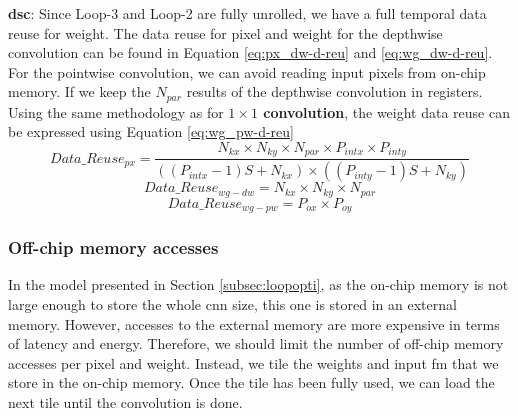 \textbf{\acrshort{dsc}}: Since Loop-3 and Loop-2 are fully unrolled, we have a full temporal data reuse for weight. The data reuse for pixel and weight for the depthwise convolution can be found in Equation \eqref{eq:px_dw-d-reu} \cite{ma_optimizing_2018} and \eqref{eq:wg_dw-d-reu}. For the pointwise convolution, we can avoid reading input pixels from on-chip memory. If we keep the $N_{par}$ results of the depthwise convolution in registers.
Using the same methodology as for \textbf{$1 \times 1$ convolution}, the weight data reuse can be expressed using Equation \eqref{eq:wg_pw-d-reu}
%
\begin{equation}
    Data\_Reuse_{px} = \frac{N_{kx} \times N_{ky} \times N_{par} \times P_{intx} \times P_{inty}}{\left( \left( P_{intx} - 1 \right)S + N_{kx} \right) \times \left( \left( P_{inty} - 1 \right)S + N_{ky} \right)}
    \label{eq:px_dw-d-reu}
\end{equation}
\begin{equation}
    Data\_Reuse_{wg-dw} = N_{kx} \times N_{ky} \times N_{par}
    \label{eq:wg_dw-d-reu}
\end{equation}
\begin{equation}
    Data\_Reuse_{wg-pw} = P_{ox} \times P_{oy}
    \label{eq:wg_pw-d-reu}
\end{equation}
%
\subsubsection{Off-chip memory accesses}
%
In the model presented in Section \ref{subsec:loopopti}, as the on-chip memory is not large enough to store the whole \acrshort{cnn} size, this one is stored in an external memory. However, accesses to the external memory are more expensive in terms of latency and energy. Therefore, we should limit the number of off-chip memory accesses per pixel and weight. Instead, we tile the weights and input \acrshort{fm} that we store in the on-chip memory. Once the tile has been fully used, we can load the next tile until the convolution is done.

